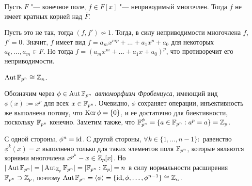 \Th Пусть $F$ "--- конечное поле, $f \in F[x]$ "--- неприводимый многочлен. Тогда $f$ не имеет кратных корней над $\overline{F}$.

\Proof 
Пусть это не так, тогда $(f, f') \not\sim 1$. Тогда, в силу неприводимости многочлена $f$, $f' = 0$. Значит, $f$ имеет вид $f = a_mx^{mp} + \dotsc + a_1x^p + a_0$ для некоторых $a_0, \dotsc, a_m \in F$. Но тогда $f = (a_mx^{m} + \dotsc + a_1x + a_0)^p$, что противоречит его неприводимости.
\EndProof

\Th $\operatorname{Aut}\mathbb{F}_{p^n} \cong \mathbb{Z}_n$.

\Proof
Обозначим через $\phi \in \operatorname{Aut}\mathbb{F}_{p^n}$ \textit{автоморфизм Фробениуса}, имеющий вид $\phi(x) := x^p$ для всех $x \in \mathbb{F}_{p^n}$. Очевидно, $\phi$ сохраняет операции, инъективность же выполнена потому, что $\operatorname{Ker}\phi = \{0\}$, и ее достаточно для биективности, поскольку $\mathbb{F}_{p^n}$ конечно. Заметим также, что $\mathbb{F}_{p^n}^\phi = \{a \in \mathbb{F}_{p^n} : a^p = a\} = \mathbb{Z}_p$.
	
	С одной стороны, $\phi^n = \operatorname{id}$. С другой стороны, $\forall k \in \{1, 
	\dotsc, n - 1\}:$ равенство $\phi^k(x) = x$ выполнено только для таких элементов поля $\mathbb{F}_{p^n}$, которые являются корнями многочлена $x^{p^k} - x \in \mathbb{Z}_p[x]$.  Но $|\operatorname{Aut}\mathbb{F}_{p^n}| = |\operatorname{Aut}_{\mathbb{Z}_p}\mathbb{F}_{p^n}| = [\mathbb{F}_{p^n} : \mathbb{Z}_p] = n$ в силу нормальности расширения $\mathbb{F}_{p^n} \supset \mathbb{Z}_p$, поэтому $\operatorname{Aut}\mathbb{F}_{p^n} = \langle\phi\rangle = \{\operatorname{id}, \phi, \dotsc, \phi^{n-1}\} \cong \mathbb{Z}_n$.

\EndProof 